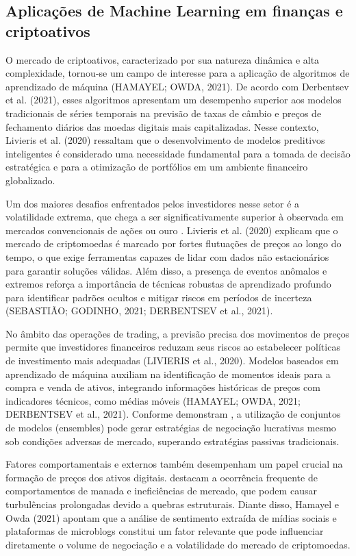 \subsection{Aplicações de Machine Learning em finanças e criptoativos}
\label{subsec_aplicacoes_de_machine_learning_em_financas_e_criptoativos}

O mercado de criptoativos, caracterizado por sua natureza dinâmica e alta complexidade, tornou-se um campo de interesse para a aplicação de algoritmos de aprendizado de máquina (HAMAYEL; OWDA, 2021). De acordo com Derbentsev et al. (2021), esses algoritmos apresentam um desempenho superior aos modelos tradicionais de séries temporais na previsão de taxas de câmbio e preços de fechamento diários das moedas digitais mais capitalizadas. Nesse contexto, Livieris et al. (2020) ressaltam que o desenvolvimento de modelos preditivos inteligentes é considerado uma necessidade fundamental para a tomada de decisão estratégica e para a otimização de portfólios em um ambiente financeiro globalizado.

Um dos maiores desafios enfrentados pelos investidores nesse setor é a volatilidade extrema, que chega a ser significativamente superior à observada em mercados convencionais de ações ou ouro \cite{park2023intelligent}. Livieris et al. (2020) explicam que o mercado de criptomoedas é marcado por fortes flutuações de preços ao longo do tempo, o que exige ferramentas capazes de lidar com dados não estacionários para garantir soluções válidas. Além disso, a presença de eventos anômalos e extremos reforça a importância de técnicas robustas de aprendizado profundo para identificar padrões ocultos e mitigar riscos em períodos de incerteza (SEBASTIÃO; GODINHO, 2021; DERBENTSEV et al., 2021).

No âmbito das operações de trading, a previsão precisa dos movimentos de preços permite que investidores financeiros reduzam seus riscos ao estabelecer políticas de investimento mais adequadas (LIVIERIS et al., 2020). Modelos baseados em aprendizado de máquina auxiliam na identificação de momentos ideais para a compra e venda de ativos, integrando informações históricas de preços com indicadores técnicos, como médias móveis (HAMAYEL; OWDA, 2021; DERBENTSEV et al., 2021). Conforme demonstram , a utilização de conjuntos de modelos (ensembles) pode gerar estratégias de negociação lucrativas mesmo sob condições adversas de mercado, superando estratégias passivas tradicionais.

Fatores comportamentais e externos também desempenham um papel crucial na formação de preços dos ativos digitais.  destacam a ocorrência frequente de comportamentos de manada e ineficiências de mercado, que podem causar turbulências prolongadas devido a quebras estruturais. Diante disso, Hamayel e Owda (2021) apontam que a análise de sentimento extraída de mídias sociais e plataformas de microblogs constitui um fator relevante que pode influenciar diretamente o volume de negociação e a volatilidade do mercado de criptomoedas.

